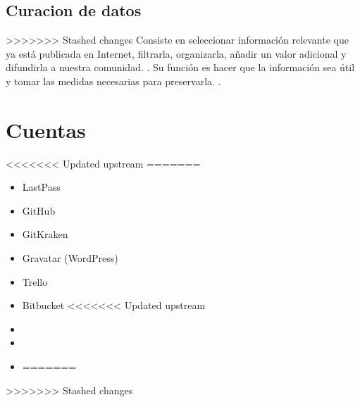 \documentclass[12pt,letterpaper]{article}
\begin{document}
\subsection*{Curacion de datos}
>>>>>>> Stashed changes
Consiste en seleccionar informaci\'on relevante que ya est\'a publicada en Internet, filtrarla, organizarla, añadir un valor adicional y difundirla a nuestra comunidad.
\cite[(Duro, S. 2017)]{ref14}.
Su funci\'on es hacer que la informaci\'on sea \'util y tomar las medidas necesarias para preservarla.
\cite[(It User. 2020)]{ref15}.

\section{Cuentas}
<<<<<<< Updated upstream
=======
\begin{itemize}
>>>>>>> Stashed changes
\item LastPass
\item GitHub
\item GitKraken
\item Gravatar (WordPress)
\item Trello
\item Bitbucket
<<<<<<< Updated upstream


\item
\item
\item
=======
\end{itemize}
>>>>>>> Stashed changes
\end{document}

